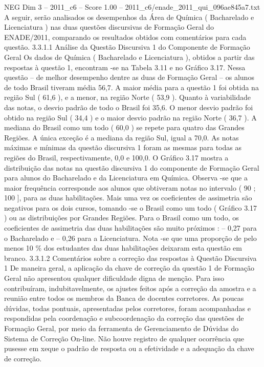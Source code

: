 \begin{textsample}{NEG Dim 3 – 2011\_c6 – Score 1.00 – 2011\_c6/enade\_2011\_qui\_096ae845a7.txt}
A seguir, serão analisados os desempenhos da Área de Química ( Bacharelado e Licenciatura ) nas duas questões discursivas de Formação Geral do ENADE/2011, comparando os resultados obtidos com comentários para cada questão. 3.3.1.1 Análise da Questão Discursiva 1 do Componente de Formação Geral Os dados de Química ( Bacharelado e Licenciatura ), obtidos a partir das respostas à questão 1, encontram -se na Tabela 3.11 e no Gráfico 3.17.
Nessa questão – de melhor desempenho dentre as duas de Formação Geral – os alunos de todo Brasil tiveram média 56,7.
A maior média para a questão 1 foi obtida na região Sul ( 61,6 ), e a menor, na região Norte ( 53,9 ).
Quanto à variabilidade das notas, o desvio padrão de todo o Brasil foi 35,6.
O menor desvio padrão foi obtido na região Sul ( 34,4 ) e o maior desvio padrão na região Norte ( 36,7 ).
A mediana do Brasil como um todo ( 60,0 ) se repete para quatro das Grandes Regiões.
A única exceção é a mediana da região Sul, igual a 70,0.
As notas máximas e mínimas da questão discursiva 1 foram as mesmas para todas as regiões do Brasil, respectivamente, 0,0 e 100,0.
O Gráfico 3.17 mostra a distribuição das notas na questão discursiva 1 do componente de Formação Geral para alunos do Bacharelado e da Licenciatura em Química.
Observa -se que a maior frequência corresponde aos alunos que obtiveram notas no intervalo ( 90 ; 100 ], para as duas habilitações.
Mais uma vez os coeficientes de assimetria são negativos para os dois cursos, tomando -se o Brasil como um todo ( Gráfico 3.17 ) ou as distribuições por Grandes Regiões.
Para o Brasil como um todo, os coeficientes de assimetria das duas habilitações são muito próximos : – 0,27 para o Bacharelado e – 0,26 para a Licenciatura.
Nota -se que uma proporção de pelo menos 10 \% dos estudantes das duas habilitações deixaram esta questão em branco. 3.3.1.2 Comentários sobre a correção das respostas à Questão Discursiva 1 De maneira geral, a aplicação da chave de correção da questão 1 de Formação Geral não apresentou qualquer dificuldade digna de menção.
Para isso contribuíram, indubitavelmente, os ajustes feitos após a correção da amostra e a reunião entre todos os membros da Banca de docentes corretores.
As poucas dúvidas, todas pontuais, apresentadas pelos corretores, foram acompanhadas e respondidas pela coordenação e subcoordenação da correção das questões de Formação Geral, por meio da ferramenta de Gerenciamento de Dúvidas do Sistema de Correção On-line.
Não houve registro de qualquer ocorrência que pusesse em xeque o padrão de resposta ou a efetividade e a adequação da chave de correção.

\end{textsample}
